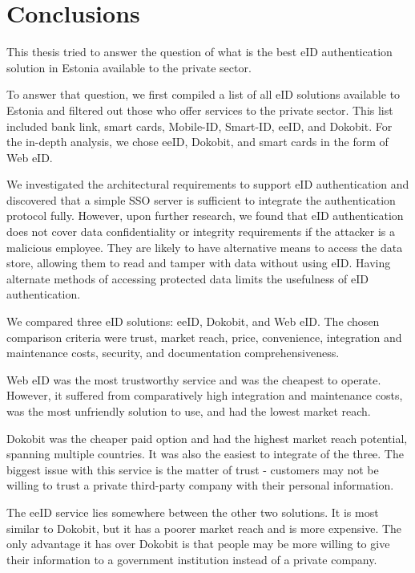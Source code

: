 \section{Conclusions}

This thesis tried to answer the question of what is the best eID authentication solution in Estonia available to the private sector.

To answer that question, we first compiled a list of all eID solutions available to Estonia and filtered out those who offer services to the private sector. This list included {bank link}, smart cards, Mobile-ID, Smart-ID, eeID, and Dokobit. For the in-depth analysis, we chose eeID, Dokobit, and smart cards in the form of Web eID.

We investigated the architectural requirements to support eID authentication and discovered that a simple SSO server is sufficient to integrate the authentication protocol fully. However, upon further research, we found that eID authentication does not cover data confidentiality or integrity requirements if the attacker is a malicious employee. They are likely to have alternative means to access the data store, allowing them to read and tamper with data without using eID. Having alternate methods of accessing protected data limits the usefulness of eID authentication.

We compared three eID solutions: eeID, Dokobit, and Web eID. The chosen comparison criteria were trust, market reach, price, convenience, integration and maintenance costs, security, and documentation comprehensiveness.

Web eID was the most trustworthy service and was the cheapest to operate. However, it suffered from comparatively high integration and maintenance costs, was the most unfriendly solution to use, and had the lowest market reach.

Dokobit was the cheaper paid option and had the highest market reach potential, spanning multiple countries. It was also the easiest to integrate of the three. The biggest issue with this service is the matter of trust - customers may not be willing to trust a private third-party company with their personal information.

The eeID service lies somewhere between the other two solutions. It is most similar to Dokobit, but it has a poorer market reach and is more expensive. The only advantage it has over Dokobit is that people may be more willing to give their information to a government institution instead of a private company.


